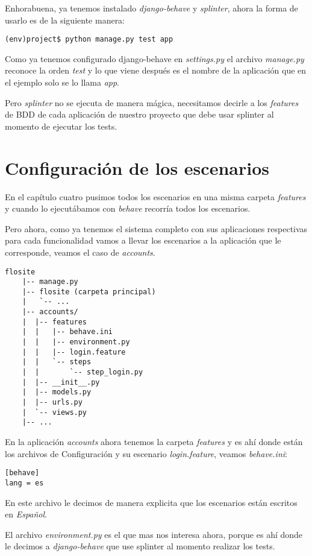 Enhorabuena, ya tenemos instalado {\it django-behave} y {\it splinter}, ahora la
forma de usarlo es de la siguiente manera:

\begin{verbatim}
(env)project$ python manage.py test app
\end{verbatim}

Como ya tenemos configurado django-behave en {\it settings.py} el archivo
{\it manage.py} reconoce la orden {\it test} y lo que viene después es el
nombre de la aplicación que en el ejemplo solo se lo llama {\it app}.

Pero {\it splinter} no se ejecuta de manera mágica, necesitamos decirle a los
{\it features} de BDD de cada aplicación de nuestro proyecto que debe usar
splinter al momento de ejecutar los tests.

\section{Configuración de los escenarios}
En el capítulo cuatro pusimos todos los escenarios en una misma carpeta {\it features}
y cuando lo ejecutábamos con {\it behave} recorría todos los escenarios.

Pero ahora, como ya tenemos el sistema completo con sus aplicaciones respectivas
para cada funcionalidad vamos a llevar los escenarios a la aplicación que le
corresponde, veamos el caso de {\it accounts}.

\begin{verbatim}
flosite
    |-- manage.py
    |-- flosite (carpeta principal)
    |   `-- ...
    |-- accounts/
    |  |-- features
    |  |   |-- behave.ini
    |  |   |-- environment.py
    |  |   |-- login.feature
    |  |   `-- steps
    |  |       `-- step_login.py
    |  |-- __init__.py
    |  |-- models.py
    |  |-- urls.py
    |  `-- views.py
    |-- ...
\end{verbatim}

En la aplicación {\it accounts} ahora tenemos la carpeta {\it features} y es ahí
donde están los archivos de Configuración y su escenario {\it login.feature},
veamos {\it behave.ini}:

\begin{verbatim}
[behave]
lang = es
\end{verbatim}

En este archivo le decimos de manera explicita que los escenarios están escritos
en {\it Español}.

El archivo {\it environment.py} es el que mas nos interesa ahora, porque es ahí
donde le decimos a {\it django-behave} que use splinter al momento realizar los
tests.

